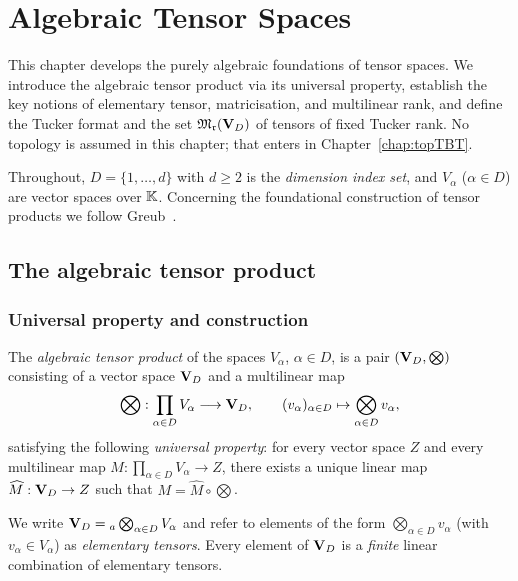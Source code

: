 %
%

\chapter{Algebraic Tensor Spaces}
\label{chap:algtensor}

This chapter develops the purely algebraic foundations of tensor spaces.
We introduce the algebraic tensor product via its universal property,
establish the key notions of elementary tensor, matricisation, and multilinear
rank, and define the Tucker format and the set $\mathfrak{M}_{\mathfrak{r}}(\mathbf{V}_D)$ of tensors
of fixed Tucker rank. No topology is assumed in this chapter; that enters
in Chapter~\ref{chap:topTBT}.

Throughout, $D = \{1, \ldots, d\}$ with $d \geq 2$ is the \emph{dimension
index set}, and $V_\alpha$ ($\alpha \in D$) are vector spaces over $\mathbb{K}$.
Concerning the foundational construction of tensor products we follow
Greub~\cite{Greub1981}.

\section{The algebraic tensor product}
\label{sec:algtensor:def}

\subsection*{Universal property and construction}

\begin{definition}
\label{def:algtensor}
The \emph{algebraic tensor product} of the spaces $V_\alpha$, $\alpha \in D$,
is a pair $(\mathbf{V}_D, \bigotimes)$ consisting of a vector space $\mathbf{V}_D$ and a
multilinear map
\begin{equation}
\label{eq:tensor_product_map}
    \bigotimes : \prod_{\alpha \in D} V_\alpha \longrightarrow \mathbf{V}_D,
    \qquad
    (v_\alpha)_{\alpha \in D} \mapsto \bigotimes_{\alpha \in D} v_\alpha,
\end{equation}
satisfying the following \emph{universal property}: for every vector space
$Z$ and every multilinear map $M: \prod_{\alpha \in D} V_\alpha \to Z$,
there exists a unique linear map $\widehat{M}: \mathbf{V}_D \to Z$ such that
$M = \widehat{M} \circ \bigotimes$.

We write $\mathbf{V}_D = {}_a\bigotimes_{\alpha \in D} V_\alpha$ and refer to elements
of the form $\bigotimes_{\alpha \in D} v_\alpha$ (with $v_\alpha \in V_\alpha$)
as \emph{elementary tensors}. Every element of $\mathbf{V}_D$ is a \emph{finite}
linear combination of elementary tensors.
\end{definition}

